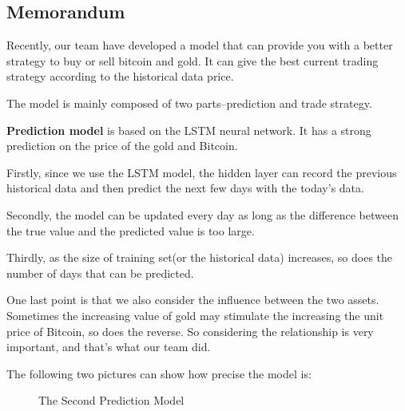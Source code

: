 \documentclass[12pt]{article}
\begin{document}
    
    


    \newpage
    \begin{appendices}

        \section{Memorandum}

        Recently, our team have developed a model that can provide you with a better strategy to buy or sell bitcoin and gold.
        It can give the best current trading strategy according to the historical data price.
        
        The model is mainly composed of two parts--prediction and trade strategy.
        
        \textbf{Prediction model} is based on the LSTM neural network.
        It has a strong prediction on the price of the gold and Bitcoin.
        
        Firstly, since we use the LSTM model, the hidden layer can record the previous historical data and then predict the next few days with the today's data. 
        
        Secondly, the model can be updated every day as long as the difference between the true value and the predicted value is too large.
        
        Thirdly, as the size of training set(or the historical data) increases, so does the number of days that can be predicted.
        
        One last point is that we also consider the influence between the two assets. 
        Sometimes the increasing value of gold may stimulate the increasing the unit price of Bitcoin, so does the reverse.
        So considering the relationship is very important, and that's what our team did.
        
        The following two pictures can show how precise the model is:
        \begin{figure}[H]
        \centering
        \caption{The Second Prediction Model}
        \label{fig:mem}
        \end{figure}
        

\end{appendices}
\end{document}
